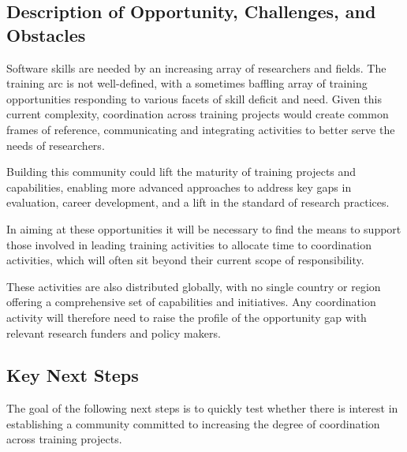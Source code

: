 \subsection{Description of Opportunity, Challenges, and Obstacles}

Software skills are needed by an increasing array of researchers and fields. The
training arc is not well-defined, with a sometimes baffling array of training
opportunities responding to various facets of skill deficit and need. Given this
current complexity, coordination across training projects would create common
frames of reference, communicating and integrating activities to better serve
the needs of researchers.

Building this community could lift the maturity of training projects and
capabilities, enabling more advanced approaches to address key gaps in
evaluation, career development, and a lift in the standard of research
practices.

In aiming at these opportunities it will be necessary to find the means to
support those involved in leading training activities to allocate time to
coordination activities, which will often sit beyond their current scope of
responsibility.

These activities are also distributed globally, with no single country or region
offering a comprehensive set of capabilities and initiatives. Any coordination
activity will therefore need to raise the profile of the opportunity gap with
relevant research funders and policy makers.

\subsection{Key Next Steps}

The goal of the following next steps is to quickly test whether there is
interest in establishing a community committed to increasing the degree of
coordination across training projects.

